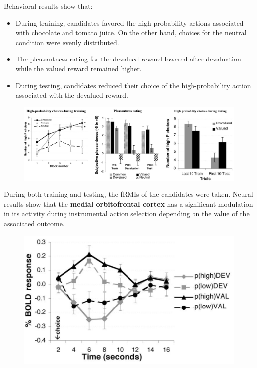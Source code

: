 \begin{casestudy}
    Behavioral results show that:
    \begin{itemize}
        \item During training, candidates favored the high-probability actions associated with chocolate and tomato juice.
            On the other hand, choices for the neutral condition were evenly distributed.
        \item The pleasantness rating for the devalued reward lowered after devaluation while the valued reward remained higher.
        \item During testing, candidates reduced their choice of the high-probability action associated with the devalued reward.
    \end{itemize}
    \begin{figure}[H]
        \centering
        \includegraphics[width=0.95\linewidth]{./img/human_goal_directed_experiment3.png}
    \end{figure}

    During both training and testing, the fRMIs of the candidates were taken.
    Neural results show that the \textbf{medial orbitofrontal cortex }has a significant modulation in its activity during instrumental action selection
    depending on the value of the associated outcome.
    \begin{figure}[H]
        \centering
        \includegraphics[width=0.4\linewidth]{./img/human_goal_directed_experiment4.png}
    \end{figure}
\end{casestudy}

